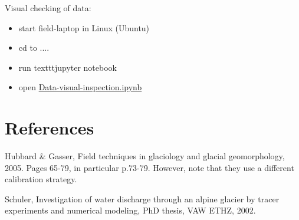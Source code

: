 \documentclass[DIV=15,halfparskip,11pt,headinclude]{scrartcl}
\begin{document}
Visual checking of data:
\begin{itemize}
\item start field-laptop in Linux (Ubuntu)
\item cd to ....
\item run texttt{jupyter notebook}
\item open \url{Data-visual-inspection.ipynb}
\end{itemize}



\section{References}

Hubbard \& Gasser, Field techniques in glaciology and glacial
geomorphology, 2005.  Pages 65-79, in particular p.73-79.  However,
note that they use a different calibration strategy.

Schuler, Investigation of water discharge through an alpine glacier by
tracer experiments and numerical modeling, PhD thesis, VAW ETHZ, 2002.
\end{document}
